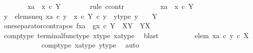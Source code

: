 \begin{isabellebody}
\ \ \ \ \ \ \isamarkupfalse%
\ {\isachardoublequoteopen}xa\ {\isacharequal}{\kern0pt}\ x\ {\isasymcirc}\isactrlsub c\ {\isasymbeta}\isactrlbsub Y\isactrlesub {\isachardoublequoteclose}\isanewline
\ \ \ \ \ \ \isamarkupfalse%
\ {\isacharparenleft}{\kern0pt}rule\ ccontr{\isacharparenright}{\kern0pt}\isanewline
\ \ \ \ \ \ \ \ \isamarkupfalse%
\ {\isachardoublequoteopen}xa\ {\isasymnoteq}\ x\ {\isasymcirc}\isactrlsub c\ {\isasymbeta}\isactrlbsub Y\isactrlesub {\isachardoublequoteclose}\isanewline
\ \ \ \ \ \ \ \ \isamarkupfalse%
\ \isamarkupfalse%
\ y\ \ elems{\isacharunderscore}{\kern0pt}neq{\isacharcolon}{\kern0pt}\ {\isachardoublequoteopen}xa\ {\isasymcirc}\isactrlsub c\ y\ {\isasymnoteq}\ {\isacharparenleft}{\kern0pt}x\ {\isasymcirc}\isactrlsub c\ {\isasymbeta}\isactrlbsub Y\isactrlesub {\isacharparenright}{\kern0pt}\ {\isasymcirc}\isactrlsub c\ y{\isachardoublequoteclose}\ \ y{\isacharunderscore}{\kern0pt}type{\isacharcolon}{\kern0pt}\ {\isachardoublequoteopen}y\ {\isacharcolon}{\kern0pt}\ {\isasymone}\ {\isasymrightarrow}\ Y{\isachardoublequoteclose}\isanewline
\ \ \ \ \ \ \ \ \ \ \isamarkupfalse%
\ one{\isacharunderscore}{\kern0pt}separator{\isacharunderscore}{\kern0pt}contrapos{\isacharbrackleft}{\kern0pt}\ f{\isacharequal}{\kern0pt}xa{\isacharcomma}{\kern0pt}\ \ g{\isacharequal}{\kern0pt}{\isachardoublequoteopen}x\ {\isasymcirc}\isactrlsub c\ {\isasymbeta}\isactrlbsub Y\isactrlesub {\isachardoublequoteclose}{\isacharcomma}{\kern0pt}\ \ X{\isacharequal}{\kern0pt}Y{\isacharcomma}{\kern0pt}\ \ Y{\isacharequal}{\kern0pt}X{\isacharbrackright}{\kern0pt}\isanewline
\ \ \ \ \ \ \ \ \ \ \isamarkupfalse%
\ comp{\isacharunderscore}{\kern0pt}type\ terminal{\isacharunderscore}{\kern0pt}func{\isacharunderscore}{\kern0pt}type\ x{\isacharunderscore}{\kern0pt}type\ xa{\isacharunderscore}{\kern0pt}type\ \isamarkupfalse%
\ blast\isanewline
\ \ \ \ \ \ \ \ \isamarkupfalse%
\ elem{}{\isacharcolon}{\kern0pt}\ {\isachardoublequoteopen}xa\ {\isasymcirc}\isactrlsub c\ y\ {\isasymin}\isactrlsub c\ X{\isachardoublequoteclose}\isanewline
\ \ \ \ \ \ \ \ \ \ \isamarkupfalse%
\ comp{\isacharunderscore}{\kern0pt}type\ xa{\isacharunderscore}{\kern0pt}type\ y{\isacharunderscore}{\kern0pt}type\ \isamarkupfalse%
\ auto\isanewline
\ \ \ \ \ \ \ \ \isamarkupfalse%

\end{isabellebody}
